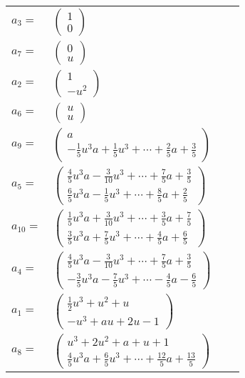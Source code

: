 \documentclass[1p]{elsarticle_modified}
\theoremstyle{definition}
\begin{document}
\begin{tabular}{m{7pt} m{180pt} m{7pt} m{180pt} }
\flushright $a_{3}=$&$\begin{pmatrix}1\\0\end{pmatrix}$ \\
\flushright $a_{7}=$&$\begin{pmatrix}0\\u\end{pmatrix}$ \\
\flushright $a_{2}=$&$\begin{pmatrix}1\\- u^2\end{pmatrix}$ \\
\flushright $a_{6}=$&$\begin{pmatrix}u\\u\end{pmatrix}$ \\
\flushright $a_{9}=$&$\begin{pmatrix}a\\-\frac{1}{5} u^3 a+\frac{1}{5} u^3+\cdots+\frac{2}{5} a+\frac{3}{5}\end{pmatrix}$ \\
\flushright $a_{5}=$&$\begin{pmatrix}\frac{4}{5} u^3 a-\frac{3}{10} u^3+\cdots+\frac{7}{5} a+\frac{3}{5}\\\frac{6}{5} u^3 a-\frac{1}{5} u^3+\cdots+\frac{8}{5} a+\frac{2}{5}\end{pmatrix}$ \\
\flushright $a_{10}=$&$\begin{pmatrix}\frac{1}{5} u^3 a+\frac{3}{10} u^3+\cdots+\frac{3}{5} a+\frac{7}{5}\\\frac{3}{5} u^3 a+\frac{7}{5} u^3+\cdots+\frac{4}{5} a+\frac{6}{5}\end{pmatrix}$ \\
\flushright $a_{4}=$&$\begin{pmatrix}\frac{4}{5} u^3 a-\frac{3}{10} u^3+\cdots+\frac{7}{5} a+\frac{3}{5}\\-\frac{3}{5} u^3 a-\frac{7}{5} u^3+\cdots-\frac{4}{5} a-\frac{6}{5}\end{pmatrix}$ \\
\flushright $a_{1}=$&$\begin{pmatrix}\frac{1}{2} u^3+u^2+u\\- u^3+a u+2 u-1\end{pmatrix}$ \\
\flushright $a_{8}=$&$\begin{pmatrix}u^3+2 u^2+a+u+1\\\frac{4}{5} u^3 a+\frac{6}{5} u^3+\cdots+\frac{12}{5} a+\frac{13}{5}\end{pmatrix}$ \\

\end{tabular}
\end{document}
